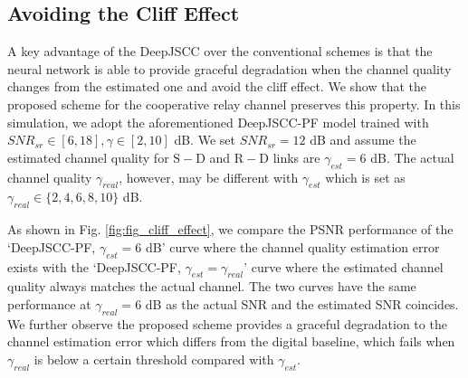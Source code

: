 \subsection{Avoiding the Cliff Effect} 
A key advantage of the DeepJSCC over the conventional schemes is that the neural network is able to provide graceful degradation when the channel quality changes from the estimated one and avoid the cliff effect. We show that the proposed scheme for the cooperative relay channel preserves this property. In this simulation, we adopt the aforementioned DeepJSCC-PF model trained with $SNR_{sr} \in [6, 18], \gamma \in [2, 10]$ dB. We set $SNR_{sr} = 12$ dB and assume the estimated channel quality for $\mathrm{S}-\mathrm{D}$ and $\mathrm{R}-\mathrm{D}$ links are $\gamma_{est} = 6$ dB. The actual channel quality $\gamma_{real}$, however, may be different with $\gamma_{est}$ which is set as $\gamma_{real} \in \{2, 4, 6, 8, 10\}$ dB.

As shown in Fig. \ref{fig:fig_cliff_effect}, we compare the PSNR performance of the `DeepJSCC-PF, $\gamma_{est} = 6$ dB' curve where the channel quality estimation error exists with 
the `DeepJSCC-PF, $\gamma_{est} = \gamma_{real}$' curve where the estimated channel quality always matches the actual channel. The two curves have the same performance at $\gamma_{real} = 6$ dB as the actual SNR and the estimated SNR coincides. We further observe the proposed scheme provides a graceful degradation to the channel estimation error which differs from the digital baseline, which fails when $\gamma_{real}$ is below a certain threshold compared with $\gamma_{est}$.